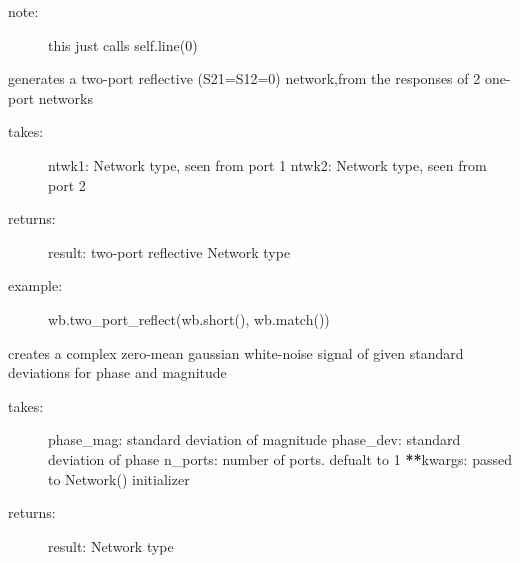 \documentclass[letterpaper,10pt,english]{sphinxmanual}
\begin{document}
\begin{fulllineitems}
\begin{fulllineitems}
\begin{description}
\item[{note:}] \leavevmode
this just calls self.line(0)

\end{description}

\end{fulllineitems}


\begin{fulllineitems}
\label{auto_workingband:mwavepy.WorkingBand.tline}
\end{fulllineitems}


\begin{fulllineitems}
\label{auto_workingband:mwavepy.WorkingBand.two_port_reflect}
generates a two-port reflective (S21=S12=0) network,from the
responses of 2 one-port networks
\begin{description}
\item[{takes:}] \leavevmode
ntwk1: Network type, seen from port 1
ntwk2: Network type, seen from port 2

\item[{returns:}] \leavevmode
result: two-port reflective Network type

\item[{example:}] \leavevmode
wb.two\_port\_reflect(wb.short(), wb.match())

\end{description}

\end{fulllineitems}


\begin{fulllineitems}
\label{auto_workingband:mwavepy.WorkingBand.white_gaussian_polar}
creates a complex zero-mean gaussian white-noise signal of given
standard deviations for phase and magnitude
\begin{description}
\item[{takes:}] \leavevmode
phase\_mag: standard deviation of magnitude
phase\_dev: standard deviation of phase
n\_ports: number of ports. defualt to 1
{\color{red}\bfseries{}**}kwargs: passed to Network() initializer

\item[{returns:}] \leavevmode
result: Network type

\end{description}

\end{fulllineitems}


\end{fulllineitems}
\end{document}
